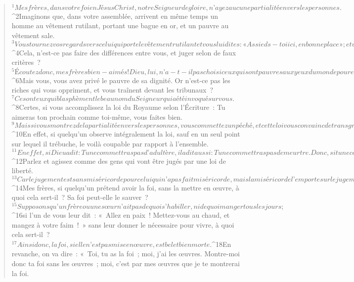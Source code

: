         
      \bchapter{}
      \begin{verse}
${}^{1}Mes frères, dans votre foi en Jésus Christ, notre Seigneur de gloire, n’ayez aucune partialité envers les personnes. 
${}^{2}Imaginons que, dans votre assemblée, arrivent en même temps un homme au vêtement rutilant, portant une bague en or, et un pauvre au vêtement sale. 
${}^{3}Vous tournez vos regards vers celui qui porte le vêtement rutilant et vous lui dites : « Assieds-toi ici, en bonne place » ; et vous dites au pauvre : « Toi, reste là debout », ou bien : « Assieds-toi au bas de mon marchepied ». 
${}^{4}Cela, n’est-ce pas faire des différences entre vous, et juger selon de faux critères ? 
${}^{5}Écoutez donc, mes frères bien-aimés ! Dieu, lui, n’a-t-il pas choisi ceux qui sont pauvres aux yeux du monde pour en faire des riches dans la foi, et des héritiers du Royaume promis par lui à ceux qui l’auront aimé ? 
${}^{6}Mais vous, vous avez privé le pauvre de sa dignité. Or n’est-ce pas les riches qui vous oppriment, et vous traînent devant les tribunaux ? 
${}^{7}Ce sont eux qui blasphèment le beau nom du Seigneur qui a été invoqué sur vous.
${}^{8}Certes, si vous accomplissez la loi du Royaume selon l’Écriture : Tu aimeras ton prochain comme toi-même, vous faites bien. 
${}^{9}Mais si vous montrez de la partialité envers les personnes, vous commettez un péché, et cette loi vous convainc de transgression. 
${}^{10}En effet, si quelqu’un observe intégralement la loi, sauf en un seul point sur lequel il trébuche, le voilà coupable par rapport à l’ensemble. 
${}^{11}En effet, si Dieu a dit : Tu ne commettras pas d’adultère, il a dit aussi : Tu ne commettras pas de meurtre. Donc, si tu ne commets pas d’adultère mais si tu commets un meurtre, te voilà transgresseur de la loi.
${}^{12}Parlez et agissez comme des gens qui vont être jugés par une loi de liberté. 
${}^{13}Car le jugement est sans miséricorde pour celui qui n’a pas fait miséricorde, mais la miséricorde l’emporte sur le jugement.
${}^{14}Mes frères, si quelqu’un prétend avoir la foi, sans la mettre en œuvre, à quoi cela sert-il ? Sa foi peut-elle le sauver ? 
${}^{15}Supposons qu’un frère ou une sœur n’ait pas de quoi s’habiller, ni de quoi manger tous les jours ; 
${}^{16}si l’un de vous leur dit : « Allez en paix ! Mettez-vous au chaud, et mangez à votre faim ! » sans leur donner le nécessaire pour vivre, à quoi cela sert-il ? 
${}^{17}Ainsi donc, la foi, si elle n’est pas mise en œuvre, est bel et bien morte.
${}^{18}En revanche, on va dire : « Toi, tu as la foi ; moi, j’ai les œuvres. Montre-moi donc ta foi sans les œuvres ; moi, c’est par mes œuvres que je te montrerai la foi. 

\end{verse}
